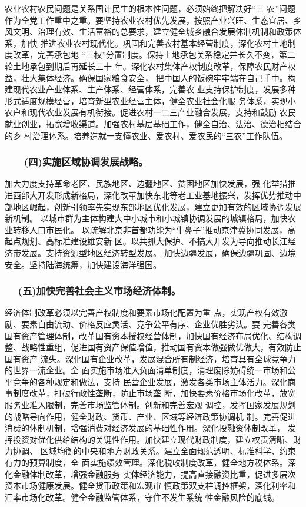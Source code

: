 \documentclass[11pt]{ctexart}
\begin{document}
{{{{农业农村农民问题是关系国计民生的根本性问题，必须始终把解决好“三
农”问题作为全党工作重中之重。要坚持农业农村优先发展，按照产业兴旺、生态宜居、乡
风文明、治理有效、生活富裕的总要求，建立健全城乡融合发展体制机制和政策体系，加快
推进农业农村现代化。巩固和完善农村基本经营制度，深化农村土地制度改革，完善承包地
“三权”分置制度。保持土地承包关系稳定并长久不变，第二轮土地承包到期后再延长三十
年。深化农村集体产权制度改革，保障农民财产权益，壮大集体经济。确保国家粮食安全，
把中国人的饭碗牢牢端在自己手中。构建现代农业产业体系、生产体系、经营体系，完善农
业支持保护制度，发展多种形式适度规模经营，培育新型农业经营主体，健全农业社会化服
务体系，实现小农户和现代农业发展有机衔接。促进农村一二三产业融合发展，支持和鼓励
农民就业创业，拓宽增收渠道。加强农村基层基础工作，健全自治、法治、德治相结合的乡
村治理体系。培养造就一支懂农业、爱农村、爱农民的“三农”工作队伍。

\subsubsection{　　(四)实施区域协调发展战略。}
\label{sec:orgfbcaece}

加大力度支持革命老区、民族地区、边疆地区、贫困地区加快发展，强
化举措推进西部大开发形成新格局，深化改革加快东北等老工业基地振兴，发挥优势推动中
部地区崛起，创新引领率先实现东部地区优化发展，建立更加有效的区域协调发展新机制。
以城市群为主体构建大中小城市和小城镇协调发展的城镇格局，加快农业转移人口市民化。
以疏解北京非首都功能为“牛鼻子”推动京津冀协同发展，高起点规划、高标准建设雄安新
区。以共抓大保护、不搞大开发为导向推动长江经济带发展。支持资源型地区经济转型发展。
加快边疆发展，确保边疆巩固、边境安全。坚持陆海统筹，加快建设海洋强国。

\subsubsection{　 (五)加快完善社会主义市场经济体制。}
\label{sec:org2dcbbf4}

经济体制改革必须以完善产权制度和要素市场化配置为重
点，实现产权有效激励、要素自由流动、价格反应灵活、竞争公平有序、企业优胜劣汰。要
完善各类国有资产管理体制，改革国有资本授权经营体制，加快国有经济布局优化、结构调
整、战略性重组，促进国有资产保值增值，推动国有资本做强做优做大，有效防止国有资产
流失。深化国有企业改革，发展混合所有制经济，培育具有全球竞争力的世界一流企业。全
面实施市场准入负面清单制度，清理废除妨碍统一市场和公平竞争的各种规定和做法，支持
民营企业发展，激发各类市场主体活力。深化商事制度改革，打破行政性垄断，防止市场垄
断，加快要素价格市场化改革，放宽服务业准入限制，完善市场监管体制。创新和完善宏观
调控，发挥国家发展规划的战略导向作用，健全财政、货币、产业、区域等经济政策协调机
制。完善促进消费的体制机制，增强消费对经济发展的基础性作用。深化投融资体制改革，
发挥投资对优化供给结构的关键性作用。加快建立现代财政制度，建立权责清晰、财力协调、
区域均衡的中央和地方财政关系。建立全面规范透明、标准科学、约束有力的预算制度，全
面实施绩效管理。深化税收制度改革，健全地方税体系。深化金融体制改革，增强金融服务
实体经济能力，提高直接融资比重，促进多层次资本市场健康发展。健全货币政策和宏观审
慎政策双支柱调控框架，深化利率和汇率市场化改革。健全金融监管体系，守住不发生系统
性金融风险的底线。

}}}}
\end{document}
